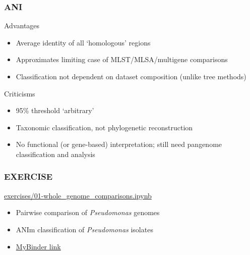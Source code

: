 \begin{frame}
  \frametitle{ANI}
  \begin{alertblock}{Advantages}
    \begin{itemize}
      \item Average identity of all `homologous' regions
      \item Approximates limiting case of MLST/MLSA/multigene comparisons
      \item Classification not dependent on dataset composition (unlike tree methods)
    \end{itemize}    
  \end{alertblock}
  \begin{block}{Criticisms}
    \begin{itemize}
      \item 95\% threshold `arbitrary'
      \item Taxonomic classification, not phylogenetic reconstruction
      \item No functional (or gene-based) interpretation; still need pangenome classification and analysis
    \end{itemize}
  \end{block}
\end{frame}

\begin{frame}
  \frametitle{EXERCISE}
  \begin{alertblock}{\url{exercises/01-whole_genome_comparisons.ipynb}}
    \begin{itemize}
      \item Pairwise comparison of \textit{Pseudomonas} genomes
      \item ANIm classification of \textit{Pseudomonas} isolates
    \end{itemize}
  \end{alertblock}
  \begin{itemize}
    \item \textcolor{hutton_purple}{\href{http://mybinder.org/repo/widdowquinn/Teaching-EMBL-Plant-Path-Genomics}{MyBinder link}}
  \end{itemize}
\end{frame}